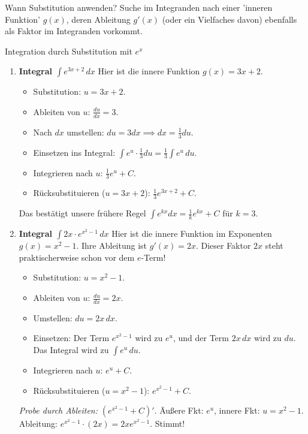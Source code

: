 \begin{tippumgebung}{Wann Substitution anwenden?}
Suche im Integranden nach einer 'inneren Funktion' $g(x)$, deren Ableitung $g'(x)$ (oder ein Vielfaches davon) ebenfalls als Faktor im Integranden vorkommt.
\end{tippumgebung}

\begin{beispielumgebung}{Integration durch Substitution mit $e^x$}
\begin{enumerate}
    \item \textbf{Integral $\int e^{3x+2} \,dx$}
        Hier ist die innere Funktion $g(x) = 3x+2$.
        \begin{itemize}
            \item Substitution: $u = 3x+2$.
            \item Ableiten von $u$: $\frac{du}{dx} = 3$.
            \item Nach $dx$ umstellen: $du = 3dx \implies dx = \frac{1}{3}du$.
            \item Einsetzen ins Integral: $\int e^u \cdot \frac{1}{3}du = \frac{1}{3} \int e^u \,du$.
            \item Integrieren nach $u$: $\frac{1}{3} e^u + C$.
            \item Rücksubstituieren ($u=3x+2$): $\frac{1}{3}e^{3x+2} + C$.
        \end{itemize}
        Das bestätigt unsere frühere Regel $\int e^{kx}dx = \frac{1}{k}e^{kx}+C$ für $k=3$.

    \item \textbf{Integral $\int 2x \cdot e^{x^2-1} \,dx$}
        Hier ist die innere Funktion im Exponenten $g(x) = x^2-1$. Ihre Ableitung ist $g'(x)=2x$. Dieser Faktor $2x$ steht praktischerweise schon vor dem $e$-Term!
        \begin{itemize}
            \item Substitution: $u = x^2-1$.
            \item Ableiten von $u$: $\frac{du}{dx} = 2x$.
            \item Umstellen: $du = 2x \,dx$.
            \item Einsetzen: Der Term $e^{x^2-1}$ wird zu $e^u$, und der Term $2x \,dx$ wird zu $du$.
            Das Integral wird zu $\int e^u \,du$.
            \item Integrieren nach $u$: $e^u + C$.
            \item Rücksubstituieren ($u=x^2-1$): $e^{x^2-1} + C$.
        \end{itemize}
        \textit{Probe durch Ableiten:} $(e^{x^2-1}+C)'$. Äußere Fkt: $e^u$, innere Fkt: $u=x^2-1$.
        Ableitung: $e^{x^2-1} \cdot (2x) = 2x e^{x^2-1}$. Stimmt!
\end{enumerate}
\end{beispielumgebung}

